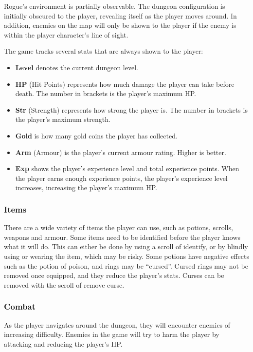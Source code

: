\documentclass[12pt,a4paper]{article}
\begin{document}
    Rogue's environment is partially observable.
    The dungeon configuration is initially obscured to the player, revealing itself as the player moves around.
    In addition, enemies on the map will only be shown to the player if the enemy is within the player character's line of sight.

    The game tracks several stats that are always shown to the player:
    \begin{itemize}
        \item \textbf{Level} denotes the current dungeon level.
        \item \textbf{HP} (Hit Points) represents how much damage the player can take before death.
            The number in brackets is the player's maximum HP.
        \item \textbf{Str} (Strength) represents how strong the player is.
            The number in brackets is the player's maximum strength.
        \item \textbf{Gold} is how many gold coins the player has collected.
        \item \textbf{Arm} (Armour) is the player's current armour rating.
            Higher is better.
        \item \textbf{Exp} shows the player's experience level and total experience points.
            When the player earns enough experience points, the player's experience level increases, increasing the player's maximum HP.
    \end{itemize}

    \subsubsection{Items}\label{subsubsec:items}

    There are a wide variety of items the player can use, such as potions, scrolls, weapons and armour.
    Some items need to be identified before the player knows what it will do.
    This can either be done by using a scroll of identify, or by blindly using or wearing the item, which may be risky.
    Some potions have negative effects such as the potion of poison, and rings may be ``cursed''.
    Cursed rings may not be removed once equipped, and they reduce the player's stats.
    Curses can be removed with the scroll of remove curse.

    \subsubsection{Combat}\label{subsubsec:combat}
    As the player navigates around the dungeon, they will encounter enemies of increasing difficulty.
    Enemies in the game will try to harm the player by attacking and reducing the player's HP\@.
\end{document}
